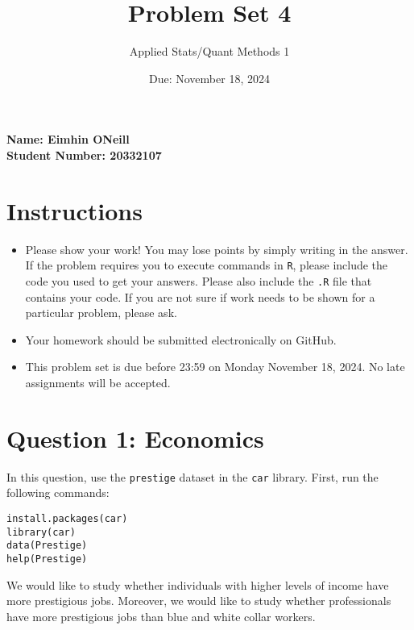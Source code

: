 \documentclass[12pt,letterpaper]{article}
\title{Problem Set 4}
\date{Due: November 18, 2024}
\author{Applied Stats/Quant Methods 1}
\begin{document}
		\maketitle
		\vspace{-2em} 
		\noindent \textbf{Name: Eimhin ONeill} \\
		\noindent \textbf{Student Number: 20332107} \\
	
	\maketitle
	\section*{Instructions}
	\begin{itemize}
		\item Please show your work! You may lose points by simply writing in the answer. If the problem requires you to execute commands in \texttt{R}, please include the code you used to get your answers. Please also include the \texttt{.R} file that contains your code. If you are not sure if work needs to be shown for a particular problem, please ask.
		\item Your homework should be submitted electronically on GitHub.
		\item This problem set is due before 23:59 on Monday November 18, 2024. No late assignments will be accepted.
	\end{itemize}



	\vspace{.5cm}
\section*{Question 1: Economics}
\vspace{.25cm}
\noindent 	
In this question, use the \texttt{prestige} dataset in the \texttt{car} library. First, run the following commands:

\begin{verbatim}
install.packages(car)
library(car)
data(Prestige)
help(Prestige)
\end{verbatim} 


\noindent We would like to study whether individuals with higher levels of income have more prestigious jobs. Moreover, we would like to study whether professionals have more prestigious jobs than blue and white collar workers.
\end{document}
